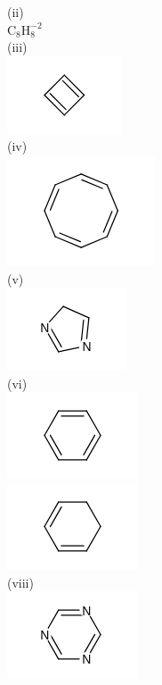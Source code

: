 \documentclass[10pt]{article}
\begin{document}
(ii)\\
$\mathrm{C}_{8} \mathrm{H}_{8}^{-2}$\\
(iii)\\
\includegraphics{smile-13437704a76552f8e56046738c7b8ed1d00f3281}\\
(iv)\\
\includegraphics{smile-e39e17fbd0181f10f76c35cbcdb865e35aaa9f7b}\\
(v)\\
\includegraphics{smile-64de564a89c27f4705f30e8a6c62e6c1afaf3cc2}\\
(vi)\\
\includegraphics{smile-d466682c95a3cca0254224e8f38f2fee54661083}\\
\includegraphics{smile-b9c6c4c8389cd5232838d0ff94090b9c420e949e}\\
(viii)\\
\includegraphics{smile-d1838413f5ffbdd51fd9b7fe54fee23c9e47e8ab}\\
\end{document}
